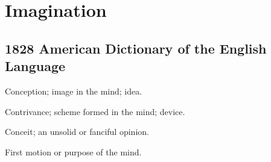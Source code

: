 \section{Imagination}
	\label{IMAGINATION}
	

\subsection{1828 American Dictionary of the English Language} %
	\label{IMAGINATION-1828}

	\begin{compactitem}
		\item[1] Conception; image in the mind; idea.
		\item[2] Contrivance; scheme formed in the mind; device.
		\item[3] Conceit; an unsolid or fanciful opinion.
		\item[4] First motion or purpose of the mind.
	\end{compactitem}




	

